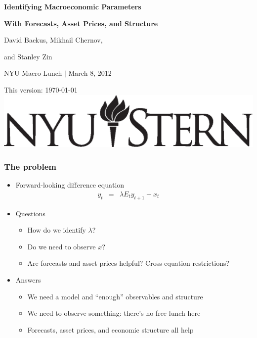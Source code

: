 \documentclass{beamer}
\title[Identification]{}
\author[Backus, Chernov, \& Zin]{}
\institute[NYU, LSE]{}
\date[]{\today}
\begin{document}
\vspace*{0.75in}
\centerline{\Large\bf Identifying Macroeconomic Parameters}
\vspace*{0.05in}
\centerline{\Large\bf With Forecasts, Asset Prices, and Structure}


\bigskip\bigskip\bigskip%
\centerline{David Backus, Mikhail Chernov,}
\centerline{and Stanley Zin}

\bigskip\bigskip\medskip%
\centerline{NYU Macro Lunch $|$ March 8, 2012}

\vfill
{\tiny \hspace{7pt}This version: \today}
{\hfill \includegraphics[scale=0.25]{stern_logo3.eps}}

\begin{frame}
\frametitle{The problem}
\begin{itemize} \itemsep=\bigskipamount
\item Forward-looking difference equation %
\begin{eqnarray*}
    y_t &=& \lambda E_t y_{t+1} + x_t \phantom{xxx}
\end{eqnarray*}
\item Questions \\
\begin{itemize}
\item How do we identify $\lambda$?
\item Do we need to observe $x$?
\item Are forecasts and asset prices helpful? Cross-equation restrictions?
\end{itemize}
\item Answers \\
\begin{itemize}
\item We need a model and ``enough'' observables and structure 
\item We need to observe something:  there's no free lunch here
\item Forecasts, asset prices, and economic structure all help
\end{itemize}
\end{itemize}
\end{frame}
\end{document}
